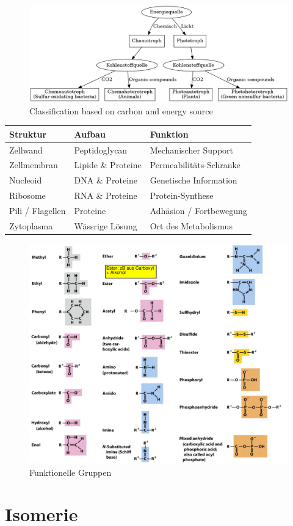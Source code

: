 \documentclass[a4paper,twocolumn,usegeometry,english,fontsize=6,DIV=16]{scrartcl}
\begin{document}
\begin{figure}
	\centering
	\includegraphics[width=0.6\linewidth]{graphs/ec_quellen.png}
	\caption{Classification based on carbon and energy source}
\end{figure}

\begin{tabu}{lll}
	\toprule
	Struktur & Aufbau & Funktion \\
	\midrule
	Zellwand & Peptidoglycan & Mechanischer Support \\
	Zellmembran & Lipide \& Proteine & Permeabilitäts-Schranke \\
	Nucleoid & DNA \& Proteine & Genetische Information \\
	Ribosome & RNA \& Proteine & Protein-Synthese \\
	Pili / Flagellen & Proteine & Adhäsion / Fortbewegung \\
	Zytoplasma & Wässrige Lösung & Ort des Metabolismus \\
	\bottomrule
\end{tabu}

\begin{figure}
	\centering
	\includegraphics[width=0.8\linewidth]{img/funktionale_gruppen.png}
	\caption{Funktionelle Gruppen}
\end{figure}

\section{Isomerie}
\end{document}
